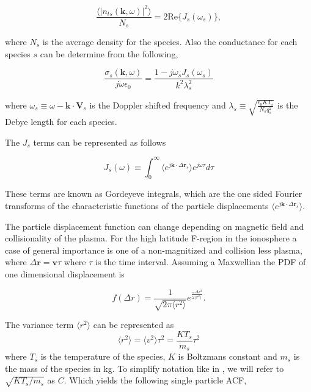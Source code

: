 \begin{equation}
\label{eq:thermalfl}
\frac{\langle|n_{ts}(\mathbf{k},\omega)|^2\rangle}{N_s} = 2\text{Re}\{J_s(\omega_s)\},
\end{equation}

\noindent where $N_s$ is the average density for the species.  Also the conductance for each species $s$ can be determine from the following,

\begin{equation}
\label{eq:cond}
\frac{\sigma_{s}(\mathbf{k},\omega)}{j\omega\epsilon_0} = \frac{1-j\omega_s J_s(\omega_s)}{k^2\lambda_s^2}
\end{equation}

\noindent where $\omega_s \equiv \omega-\mathbf{k}\cdot\mathbf{V}_s $ is the Doppler shifted frequency and $\lambda_s \equiv \sqrt{\frac{\epsilon_0 KT_s}{N_s q_s^2}}$ is the Debye length for each species.

The $J_s$ terms can be represented as follows

\begin{equation}
\label{eq:gord}
J_s(\omega)\equiv \int_0^\infty \langle e^{j\mathbf{k}\cdot\Delta \mathbf{r}_s}\rangle e^{j\omega\tau}d\tau
\end{equation}

\noindent These terms are known as Gordeyeve integrals, which are the one sided Fourier transforms of the characteristic functions of the particle displacements $\langle e^{j\mathbf{k}\cdot\Delta\mathbf{r}_s}\rangle$.  

The particle displacement function can change depending on magnetic field and collisionality of the plasma. For the high latitude F-region in the ionosphere a case of general importance is one of a non-magnitized and collision less plasma, where $\Delta\mathbf{r} = \mathbf{v}\tau$ where $\tau$ is the time interval. Assuming a Maxwellian the PDF of one dimensional displacement is

\begin{equation}
\label{eq:pdfr}
f(\Delta r) = \frac{1}{\sqrt{2\pi \langle r^2 \rangle}}e^{\frac{-\Delta r^2}{2\langle r^2\rangle}}.
\end{equation}
 
\noindent The variance term $\langle r^2 \rangle$ can be represented as
\begin{equation}
\label{eq:var}
\langle r^2 \rangle = \langle v^2 \rangle \tau^2 = \frac{KT_s}{m_s} \tau^2
\end{equation}
 \noindent where $T_s$ is the temperature of the species, $K$ is Boltzmans constant and $m_s$ is the mass of the species in kg. To simplify notation like in \citet{kudeki:milla:1}, we will refer to $\sqrt{KT_s/m_s}$ as $C$. Which yields the following single particle ACF,
 
